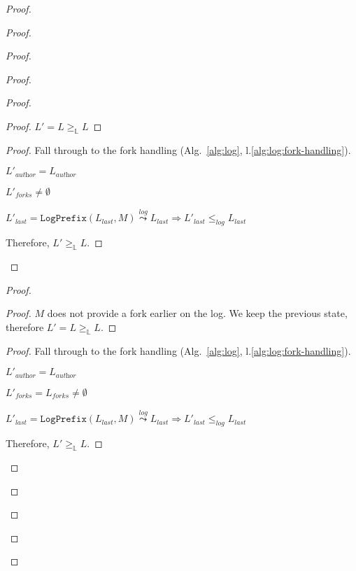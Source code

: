 \documentclass[9pt, oneside]{article}   	%
\newcommand{\logleadsto}{\overset{\textit{log}}\leadsto}
\begin{document}
\begin{proof}
\begin{proof}
\begin{proof}
\begin{proof}
\begin{proof}
					\begin{proof}
						$L' = L \geq_\mathds{L} L$
					\end{proof}
					
					\begin{proof}
						Fall through to the fork handling (Alg.~\ref{alg:log}, l.\ref{alg:log:fork-handling}).
						\begin{pfenum}
							\item $L'_\textit{author} = L_\textit{author}$
							\item $L'_\textit{forks} \neq \emptyset$
							\item $L'_\textit{last} = \texttt{LogPrefix}(L_\textit{last}, M) \logleadsto L_\textit{last} \Rightarrow L'_\textit{last} \leq_\textit{log} L_\textit{last}$
						\end{pfenum}
						Therefore, $L' \geq_\mathds{L} L$.
					\end{proof}

				\end{proof}
		
				\begin{proof}
					\begin{proof}
						$M$ does not provide a fork earlier on the log. We keep the previous state, therefore $L' = L \geq_\mathds{L} L$.
					\end{proof}
					
					\begin{proof}
						Fall through to the fork handling (Alg.~\ref{alg:log}, l.\ref{alg:log:fork-handling}).
						\begin{pfenum}
							\item $L'_\textit{author} = L_\textit{author}$
							\item $L'_\textit{forks} = L_\textit{forks} \neq \emptyset$
							\item $L'_\textit{last} = \texttt{LogPrefix}(L_\textit{last}, M) \logleadsto L_\textit{last} \Rightarrow  L'_\textit{last} \leq_\textit{log} L_\textit{last}$
						\end{pfenum}
						Therefore, $L' \geq_\mathds{L} L$.
					\end{proof}
				\end{proof}
			\end{proof}
			

\end{proof}
\end{proof}
\end{proof}
\end{document}
